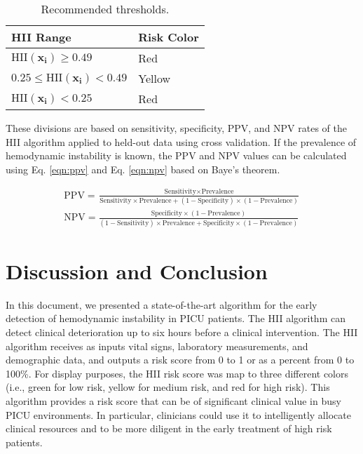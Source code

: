 \documentclass[
   technote
]{phildoc}
\newcommand{\ie}{i.e.,}
\newcommand{\hii}{HII}
\newcommand{\eq}{Eq.}
\begin{document}
\begin{table}
\center
\caption{Recommended thresholds.}
\label{tab:thresholds}
\begin{tabular}{|l|l|}
	\hline
	\textbf{HII Range} & \textbf{Risk Color} \\
	\hline
	\hline
	$\text{HII}(\bm{x_{i}})\geq 0.49$  		& Red\\
	\hline
	$0.25\leq\text{HII}(\bm{x_{i}})<0.49$	& Yellow\\
	\hline
	$\text{HII}(\bm{x_{i}}) < 0.25$  	& Red\\
	\hline
	\hline
\end{tabular}
\end{table}  

These divisions are based on sensitivity, specificity, PPV, and NPV rates of the \hii{} algorithm applied to held-out data using cross validation. If the prevalence of hemodynamic instability is known, the PPV and NPV values can be calculated using \eq{} \ref{eqn:ppv} and \eq{} \ref{eqn:npv} based on Baye's theorem. 

\begin{eqnarray}
\text{PPV} = \frac{\text{Sensitivity}\times\text{Prevalence}}{\text{Sensitivity}\times\text{Prevalence} + (1-\text{Specificity})\times(1-\text{Prevalence})} \label{eqn:ppv} \\
\text{NPV} = \frac{\text{Specificity}\times(1-\text{Prevalence})}{(1-\text{Sensitivity})\times\text{Prevalence} + \text{Specificity}\times(1-\text{Prevalence})} \label{eqn:npv}
\end{eqnarray}



\chapter{Discussion and Conclusion}
\label{conclusion}
In this document, we presented a state-of-the-art algorithm for the early detection of hemodynamic instability in PICU patients. The \hii{} algorithm can detect clinical deterioration up to six hours before a clinical intervention. The \hii{} algorithm receives as inputs vital signs, laboratory measurements, and demographic data, and outputs a risk score from 0 to 1 or as a percent from 0 to 100\%. For display purposes, the \hii{} risk score was map to three different colors (\ie{} green for low risk, yellow for medium risk, and red for high risk). This algorithm provides a risk score that can be of significant clinical value in busy PICU environments. In particular, clinicians could use it to  intelligently allocate clinical resources and to be more diligent in the early treatment of high risk patients.\\   
\end{document}
